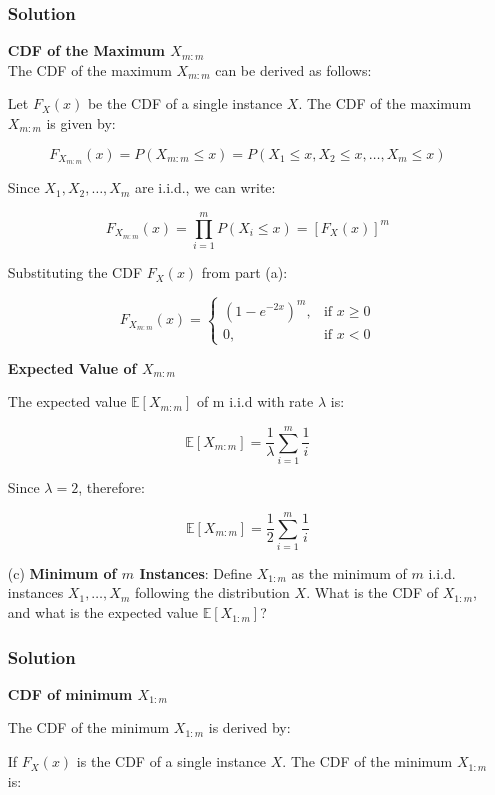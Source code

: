 \documentclass{article}
\begin{document}
\begin{enumerate}
    \subsubsection*{Solution}
    \textbf{CDF of the Maximum $X_{m:m}$}\\

    The CDF of the maximum $X_{m:m}$ can be derived as follows:

    Let $F_X(x)$ be the CDF of a single instance $X$. The CDF of the maximum $X_{m:m}$ is given by:

    \[
    F_{X_{m:m}}(x) = P(X_{m:m} \leq x) = P(X_1 \leq x, X_2 \leq x, \dots, X_m \leq x)
    \]

    Since $X_1, X_2, \dots, X_m$ are i.i.d., we can write:

    \[
    F_{X_{m:m}}(x) = \prod_{i=1}^m P(X_i \leq x) = \left[F_X(x)\right]^m
    \]

    Substituting the CDF $F_X(x)$ from part (a):

    \[
    F_{X_{m:m}}(x) =
    \begin{cases}
    \left(1 - e^{-2x}\right)^m, & \text{if } x \geq 0 \\
    0, & \text{if } x < 0
    \end{cases}
    \]

    \textbf{Expected Value of $X_{m:m}$}

    The expected value $\mathbb{E}[X_{m:m}]$ of m i.i.d with rate \(\lambda\) is:

    \[
    \mathbb{E}[X_{m:m}] = \frac{1}{\lambda} \sum_{i = 1}^{m} \frac{1}{i}
    \]



    Since \(\lambda = 2\), therefore:

    \[
    \mathbb{E}[X_{m:m}] = \frac{1}{2} \sum_{i=1}^{m} \frac{1}{i}
    \]


    \item[(c)] \textbf{Minimum of $m$ Instances}:
    Define $X_{1:m}$ as the minimum of $m$ i.i.d. instances $X_1, \dots, X_m$ following the distribution $X$. What is the CDF of $X_{1:m}$, and what is the expected value $\mathbb{E}[X_{1:m}]$?
    \subsubsection*{Solution}

    \textbf{CDF of minimum $X_{1:m}$}

    The CDF of the minimum $X_{1:m}$ is derived by:

    If $F_X(x)$ is the CDF of a single instance $X$. The CDF of the minimum $X_{1:m}$ is:


\end{enumerate}
\end{document}

